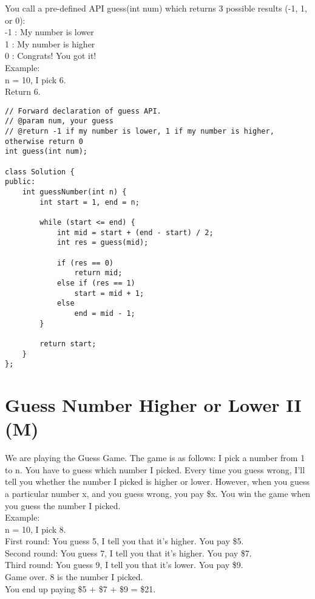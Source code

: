 You call a pre-defined API guess(int num) which returns 3 possible results (-1, 1, or 0):\\
-1 : My number is lower\\ 
 1 : My number is higher\\
 0 : Congrats! You got it!\\

Example:\\
n = 10, I pick 6.\\
Return 6.\\

\begin{lstlisting}
// Forward declaration of guess API.
// @param num, your guess
// @return -1 if my number is lower, 1 if my number is higher, otherwise return 0
int guess(int num);

class Solution {
public:
    int guessNumber(int n) {
        int start = 1, end = n;
        
        while (start <= end) {
            int mid = start + (end - start) / 2;
            int res = guess(mid);
            
            if (res == 0)   
                return mid;
            else if (res == 1)  
                start = mid + 1;
            else
                end = mid - 1;
        }
        
        return start;
    }
};
\end{lstlisting}


\section{Guess Number Higher or Lower II (M)}
We are playing the Guess Game. The game is as follows: I pick a number from 1 to n. You have to guess which number I picked. Every time you guess wrong, I'll tell you whether the number I picked is higher or lower. However, when you guess a particular number x, and you guess wrong, you pay \$x. You win the game when you guess the number I picked. \\

Example:\\
n = 10, I pick 8.\\
First round:  You guess 5, I tell you that it's higher. You pay \$5. \\
Second round: You guess 7, I tell you that it's higher. You pay \$7.\\
Third round:  You guess 9, I tell you that it's lower. You pay \$9.\\
Game over. 8 is the number I picked.\\
You end up paying \$5 + \$7 + \$9 = \$21.\\

